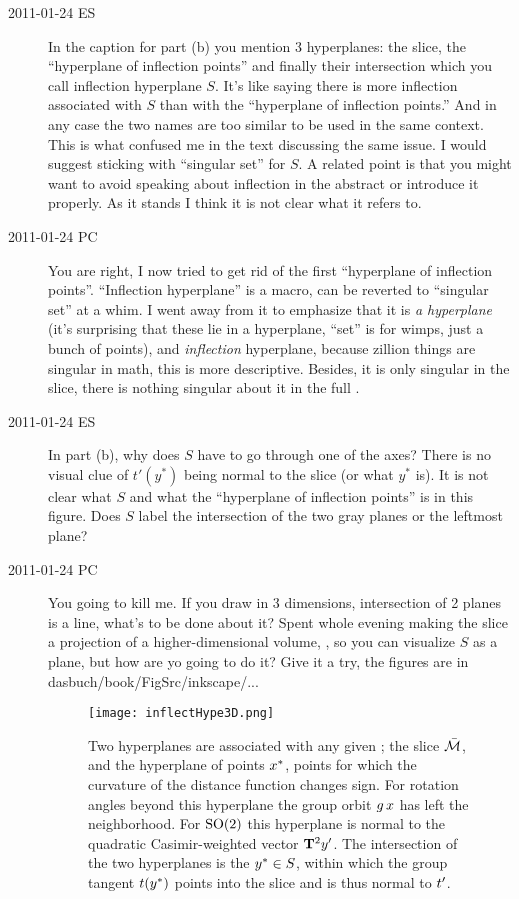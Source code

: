 \begin{description}
\item[2011-01-24 ES]
In the caption for part (b) you mention 3 hyperplanes:
the slice, the ``hyperplane of inflection points'' and finally their intersection
which you call inflection hyperplane $S$. It's like saying there is more
inflection associated with $S$ than with the
``hyperplane of inflection points.'' And in any case the two names are too
similar to be used in the same context. This is what confused me in the text
discussing the same issue.
I would suggest sticking with ``singular set'' for $S$. A related point is that
you might want to avoid speaking about inflection in the abstract or introduce
it properly. As it stands I think it is not clear what it refers to.

\item[2011-01-24 PC] You are right, I now tried to get rid of the first
``hyperplane of inflection points''. ``Inflection hyperplane'' is a
macro, can be reverted to ``singular set'' at a whim. I went away from it
to emphasize that it is \emph{a hyperplane} (it's surprising that these
lie in a hyperplane, ``set'' is for wimps, just a bunch of points), and
\emph{inflection} hyperplane, because zillion things are singular in
math, this is more descriptive. Besides, it is only singular in the
slice, there is nothing singular about it in the full \statesp.

\item[2011-01-24 ES]
In part (b), why does $S$ have to go through one of the axes? There is no
visual clue of $t'(y^*)$ being normal to the slice (or what $y^*$ is). It
is not clear what $S$ and what the ``hyperplane of inflection points'' is
in this figure. Does $S$ label the intersection of the two gray planes or
the leftmost plane?

\item[2011-01-24 PC] You going to kill me. If you draw in 3 dimensions,
intersection of 2 planes is a line, what's to be done about it? Spent
whole evening making the slice a projection of a higher-dimensional
volume, , so you can visualize $S$  as a plane,
but how are yo going to do it? Give it a try, the figures are in
dasbuch/book/FigSrc/inkscape/...


 \begin{figure}
 \begin{center}
 \texttt{[image: inflectHype3D.png]}
 \end{center}
 \caption{\label{fig:inflectHype3D}
Two hyperplanes are associated with  any given {\template} \slicep; the
slice $\bar{\cal M}$, and the hyperplane of points $x^*$, points for which
the curvature of the distance function  changes sign.
For rotation angles beyond this hyperplane the group orbit
$g\,x$ has left the {\template} neighborhood. For $\textrm{SO}(2)$ this
hyperplane is normal to the quadratic Casimir-weighted vector
$\mathbf{T}^2{y'}$. The intersection of the two hyperplanes is the {\em
\sset} $y^* \in S$, within which the group tangent
$t(y^*)$ points into the slice and is thus normal to
$t'_{}$.
 }%
 \end{figure}


\end{description}
